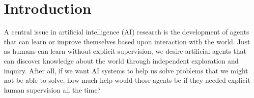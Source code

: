 \documentclass[\main/thesis.tex]{subfiles}
\begin{document}
\chapter{Introduction}











A central issue in artificial intelligence (AI) research is the development of agents that can learn or improve themselves based upon interaction with the world. Just as humans can learn without explicit supervision, we desire artificial agents that can discover knowledge about the world through independent exploration and inquiry. After all, if we want AI systems to help us solve problems that we might not be able to solve, how much help would those agents be if they needed explicit human supervision all the time?
\end{document}
